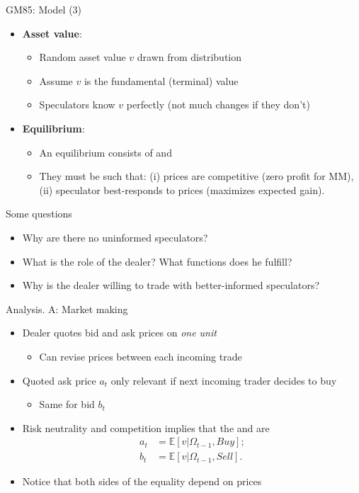 \documentclass[english,10pt
,aspectratio=169
]{beamer}
\begin{document}
\begin{frame}{GM85: Model (3)}
\begin{itemize}
	\item \textbf{Asset value}:
	\begin{itemize}
		\item Random asset value $v$ drawn from distribution
		\item Assume $v$ is the fundamental (terminal) value
		\item Speculators know $v$ perfectly (not much changes if they don't)
	\end{itemize}
	\item \textbf{Equilibrium}:
	\begin{itemize}
		\item An equilibrium consists of  and 
		\item They must be such that: (i) prices are competitive (zero profit for MM), (ii) speculator best-responds to prices (maximizes expected gain).
	\end{itemize}
\end{itemize}
\end{frame}


\begin{frame}{Some questions}
\begin{itemize}[<+->]
	\item Why are there no uninformed speculators?
	\item What is the role of the dealer? What functions does he fulfill?
	\item Why is the dealer willing to trade with better-informed speculators?
\end{itemize}
\end{frame}


\begin{frame}{Analysis. A: Market making}
\begin{itemize}[<+->]
	\item Dealer quotes bid and ask prices on \textit{one unit}
	\begin{itemize}
		\item Can revise prices between each incoming trade
	\end{itemize}
	\item Quoted ask price $a_t$ only relevant if next incoming trader decides to buy
	\begin{itemize}
		\item Same for bid $b_t$
	\end{itemize}
	\item Risk neutrality and competition implies that the  and  are
	\begin{align*}
		a_t & = \mathbb{E}[v|\Omega_{t-1}, Buy]; \\
		b_t &= \mathbb{E}[v|\Omega_{t-1},  Sell].
	\end{align*}
	\item Notice that both sides of the equality depend on prices
\end{itemize}
\end{frame}
\end{document}
